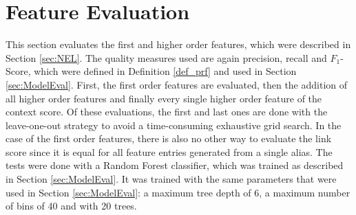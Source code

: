 \section{Feature Evaluation}
\label{sec:FeatureEval}
This section evaluates the first and higher order features, which were described in Section \ref{sec:NEL}. The quality measures used are again precision, recall and $F_1$-Score, which were defined in Definition \ref{def_prf} and used in Section \ref{sec:ModelEval}. First, the first order features are evaluated, then the addition of all higher order features and finally every single higher order feature of the context score. Of these evaluations, the first and last ones are done with the leave-one-out strategy to avoid a time-consuming exhaustive grid search. In the case of the first order features, there is also no other way to evaluate the link score since it is equal for all feature entries generated from a single alias. The tests were done with a Random Forest classifier, which was trained as described in Section \ref{sec:ModelEval}. It was trained with the same parameters that were used in Section \ref{sec:ModelEval}: a maximum tree depth of 6, a maximum number of bins of 40 and with 20 trees.\par


